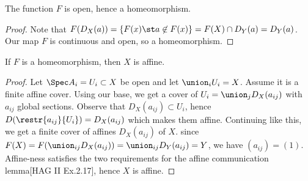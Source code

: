 \begin{comment}
\begin{definition}
Define $G(\Ip)$ to be the generic point of $V_X(\Ip)$.
\end{definition}
\begin{lemma}
The functions $F$ is a bijection.
\end{lemma}
\begin{proof}
Let $F(z)=\Ip$.
Note that $a\in F(G(\Ip))$ \iff $a\in \ker(x)$ for all $x\in V_X(\Ip)$.
We have
\begin{align*}
a\in \Ip &\Rightarrow a\in \ker(x), \forall x\in V_X(\Ip)\\
&\Rightarrow D_X(a) \cap V_X(\Ip) =\emptyset\\
&\Rightarrow a\in \ker(z)=\Ip\\
\end{align*}

Hence $FG = id_X$ and $F$ is surjective so a bijection.


Let $x\in X$. By construction $x\in V_X(F(x))$, because $F(x)=\ker(x)$.
Let $w\in V_X(F(x))$. Then $\ker(\sheaf{O}(X)\rightarrow \kappa(x))\subset \ker(\sheaf{O}(X)\rightarrow \kappa(w))$, so any open nhood $D_X(a)$ of $w$ contains $x$.
Therefore $x$ is the generic point of $V_X(F(x))$. Hence $GF = id_X$.


\end{proof}
\end{comment}

\begin{lemma}
The function $F$ is open, hence a homeomorphism.
\end{lemma}
\begin{proof}
Note that $F(D_X(a))= \{F(x) \st a\not\in F(x)\} = F(X)\cap D_Y(a) = D_Y(a)$.
Our map $F$ is continuous and open, so a homeomorphism.
\end{proof}

\begin{lemma}
If $F$ is a homeomorphism, then $X$ is affine.
\end{lemma}
\begin{proof}
Let $\Spec A_i = U_i\subset X$ be open and let $\union_i U_i = X$.
Assume it is a finite affine cover.
Using our base, we get a cover of $U_i = \union_j D_X(a_{ij})$ with $a_{ij}$ global sections.
Observe that $D_X(a_{ij})\subset U_i$, hence $D(\restr{a_{ij}}{U_i}) = D_X(a_{ij})$ which makes them affine.
Continuing like this, we get a finite cover of affines $D_X(a_{ij})$ of $X$.
since $F(X)=F(\union_{ij} D_X(a_{ij})) = \union_{ij} D_Y(a_{ij}) = Y$, we have $(a_{ij})=(1)$.
Affine-ness satisfies the two requirements for the affine communication lemma[HAG II Ex.2.17], 
hence $X$ is affine.
\end{proof}